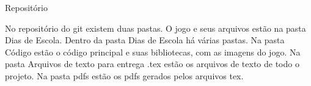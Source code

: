 \documentclass{article}
\begin{document}
\Huge{Repositório}

\normalsize{No repositório do git existem duas pastas. O jogo e seus arquivos estão na pasta Dias de Escola.
Dentro da pasta Dias de Escola há várias pastas.
Na pasta Código estão o código principal e suas bibliotecas, com as imagens do jogo.
Na pasta Arquivos de texto para entrega .tex estão os arquivos de texto de todo o projeto.
Na pasta pdfs estão os pdfs gerados pelos arquivos tex.
}
\end{document}
